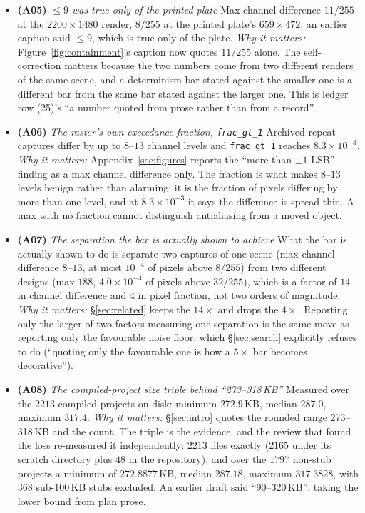 \documentclass{article}
\begin{document}
\begin{itemize}
\item \textbf{(A05)} \emph{$\le 9$ was true only of the printed plate}  Max channel difference $11/255$ at the $2200\times1480$ render, $8/255$ at the printed plate's $659\times472$; an earlier caption said $\le 9$, which is true only of the plate.  \emph{Why it matters:} Figure~\ref{fig:containment}'s caption now quotes $11/255$ alone.  The self-correction matters because the two numbers come from two different renders of the same scene, and a determinism bar stated against the smaller one is a different bar from the same bar stated against the larger one.  This is ledger row (25)'s ``a number quoted from prose rather than from a record''.
\item \textbf{(A06)} \emph{The raster's own exceedance fraction, \texttt{frac\_gt\_1}}  Archived repeat captures differ by up to $8$--$13$ channel levels and \texttt{frac\_gt\_1} reaches $8.3\times10^{-3}$.  \emph{Why it matters:} Appendix~\ref{sec:figures} reports the ``more than $\pm1$ LSB'' finding as a max channel difference only.  The fraction is what makes $8$--$13$ levels benign rather than alarming: it is the fraction of pixels differing by more than one level, and at $8.3\times10^{-3}$ it says the difference is spread thin.  A max with no fraction cannot distinguish antialiasing from a moved object.
\item \textbf{(A07)} \emph{The separation the bar is actually shown to achieve}  What the bar is actually shown to do is separate two captures of one scene (max channel difference $8$--$13$, at most $10^{-4}$ of pixels above $8/255$) from two different designs (max $188$, $4.0\times10^{-4}$ of pixels above $32/255$), which is a factor of $14$ in channel difference and $4$ in pixel fraction, not two orders of magnitude.  \emph{Why it matters:} \S\ref{sec:related} keeps the $14\times$ and drops the $4\times$.  Reporting only the larger of two factors measuring one separation is the same move as reporting only the favourable noise floor, which \S\ref{sec:search} explicitly refuses to do (``quoting only the favourable one is how a $5\times$ bar becomes decorative'').
\item \textbf{(A08)} \emph{The compiled-project size triple behind ``273--318\,KB''}  Measured over the $2213$ compiled projects on disk: minimum $272.9$\,KB, median $287.0$, maximum $317.4$.  \emph{Why it matters:} \S\ref{sec:intro} quotes the rounded range 273--318\,KB and the count.  The triple is the evidence, and the review that found the loss re-measured it independently: $2213$ files exactly ($2165$ under its scratch directory plus $48$ in the repository), and over the $1797$ non-stub projects a minimum of $272.8877$\,KB, median $287.18$, maximum $317.3828$, with $368$ sub-$100$\,KB stubs excluded.  An earlier draft said ``90--320\,KB'', taking the lower bound from plan prose.

\end{itemize}
\end{document}
